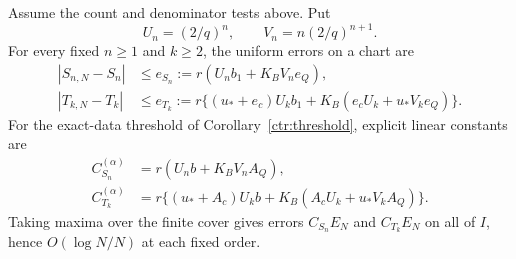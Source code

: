 \begin{theorem}
\label{ctr:moment-transfer}
Assume the count and denominator tests above. Put
\begin{equation}
 U_n=(2/q)^n,\qquad V_n=n(2/q)^{n+1}.
 \label{ctr:kernel-constants}
\end{equation}
For every fixed $n\ge1$ and $k\ge2$, the uniform errors on a chart are
\begin{align}
 |S_{n,N}-S_n|&\le e_{S_n}:=r(U_nb_1+K_BV_ne_Q),
 \label{ctr:even-error}\\
 |T_{k,N}-T_k|&\le e_{T_k}:=
 r\{(u_*+e_c)U_kb_1+K_B(e_cU_k+u_*V_ke_Q)\}.
 \label{ctr:odd-error}
\end{align}
For the exact-data threshold of Corollary~\ref{ctr:threshold}, explicit
linear constants are
\begin{equation}
 \begin{split}
 C_{S_n}^{(\alpha)}&=r(U_nb+K_BV_nA_Q),\\
 C_{T_k}^{(\alpha)}&=
 r\{(u_*+A_c)U_kb+K_B(A_cU_k+u_*V_kA_Q)\}.
 \end{split}
 \label{ctr:moment-linear-constants}
\end{equation}
Taking maxima over the finite cover gives errors $C_{S_n}E_N$ and
$C_{T_k}E_N$ on all of $I$, hence $O(\log N/N)$ at each fixed order.
\end{theorem}

